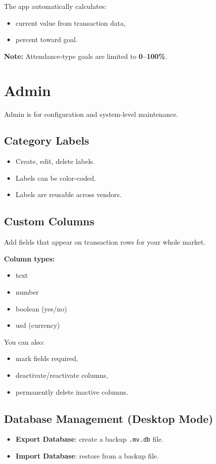 \documentclass[11pt]{article}
\begin{document}
The app automatically calculates:
\begin{itemize}
  \item current value from transaction data,
  \item percent toward goal.
\end{itemize}

\textbf{Note:} Attendance-type goals are limited to \textbf{0--100\%}.

\section{Admin}
Admin is for configuration and system-level maintenance.

\subsection{Category Labels}
\begin{itemize}
  \item Create, edit, delete labels.
  \item Labels can be color-coded.
  \item Labels are reusable across vendors.
\end{itemize}

\subsection{Custom Columns}
Add fields that appear on transaction rows for your whole market.

\textbf{Column types:}
\begin{itemize}
  \item text
  \item number
  \item boolean (yes/no)
  \item usd (currency)
\end{itemize}

You can also:
\begin{itemize}
  \item mark fields required,
  \item deactivate/reactivate columns,
  \item permanently delete inactive columns.
\end{itemize}

\subsection{Database Management (Desktop Mode)}
\begin{itemize}
  \item \textbf{Export Database}: create a backup \texttt{.mv.db} file.
  \item \textbf{Import Database}: restore from a backup file.
\end{itemize}
\end{document}
